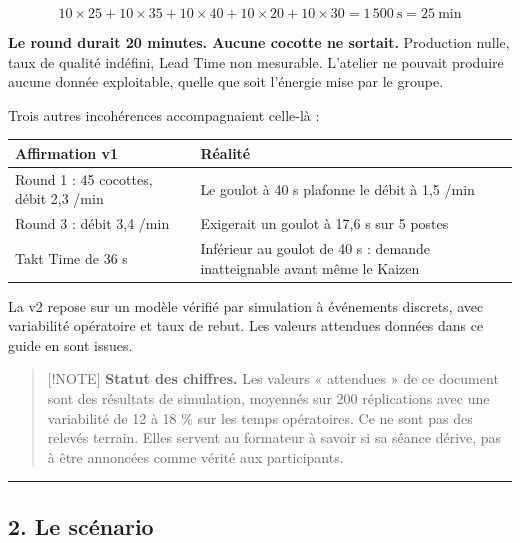 \documentclass[
]{article}
\newcounter{none} %
\begin{document}
\[
10 \times 25 + 10 \times 35 + 10 \times 40 + 10 \times 20 + 10 \times 30 = 1\,500\ \text{s} = 25\ \text{min}
\]

\textbf{Le round durait 20 minutes. Aucune cocotte ne sortait.}
Production nulle, taux de qualité indéfini, Lead Time non mesurable.
L'atelier ne pouvait produire aucune donnée exploitable, quelle que soit
l'énergie mise par le groupe.

Trois autres incohérences accompagnaient celle-là :

{\def\LTcaptype{none} %
\begin{longtable}[]{@{}
  >{\raggedright\arraybackslash}p{}
  >{\raggedright\arraybackslash}p{}@{}}
\toprule\noalign{}
\begin{minipage}[b]{\linewidth}\raggedright
Affirmation v1
\end{minipage} & \begin{minipage}[b]{\linewidth}\raggedright
Réalité
\end{minipage} \\
\midrule\noalign{}
\endhead
\bottomrule\noalign{}
\endlastfoot
Round 1 : 45 cocottes, débit 2,3 /min & Le goulot à 40 s plafonne le
débit à 1,5 /min \\
Round 3 : débit 3,4 /min & Exigerait un goulot à 17,6 s sur 5 postes \\
Takt Time de 36 s & Inférieur au goulot de 40 s : demande inatteignable
avant même le Kaizen \\
\end{longtable}
}

La v2 repose sur un modèle vérifié par simulation à événements discrets,
avec variabilité opératoire et taux de rebut. Les valeurs attendues
données dans ce guide en sont issues.

\begin{quote}
{[}!NOTE{]} \textbf{Statut des chiffres.} Les valeurs « attendues » de
ce document sont des résultats de simulation, moyennés sur 200
réplications avec une variabilité de 12 à 18 \% sur les temps
opératoires. Ce ne sont pas des relevés terrain. Elles servent au
formateur à savoir si sa séance dérive, pas à être annoncées comme
vérité aux participants.
\end{quote}

\begin{center}\rule{0.5\linewidth}{0.5pt}\end{center}

\subsection{2. Le scénario}\label{le-scuxe9nario}
\end{document}
